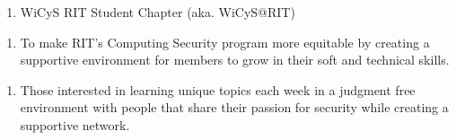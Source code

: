 

\begin{enumerate}
	\item WiCyS RIT Student Chapter (aka. WiCyS@RIT)
\end{enumerate}


\begin{enumerate}
	\item To make RIT's Computing Security program more equitable by creating a
	      supportive environment for members to grow in their soft and technical skills.
\end{enumerate}


\begin{enumerate}
	\item Those interested in learning unique topics each week in a judgment free
	      environment with people that share their passion for security while creating a
	      supportive network.
\end{enumerate}